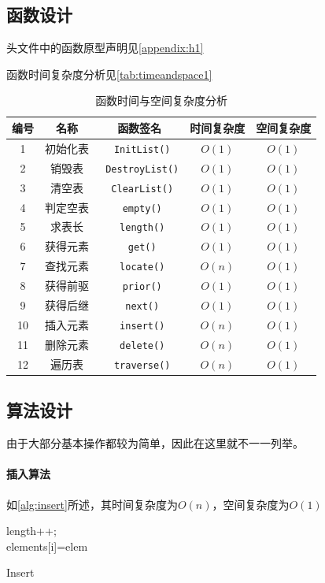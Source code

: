 \subsection{函数设计}
头文件中的函数原型声明见\autoref{appendix:h1}
\par
函数时间复杂度分析见\autoref{tab:timeandspace1}
\begin{table}[h]
\centering
\caption{函数时间与空间复杂度分析}
\label{tab:timeandspace1}
\begin{tabular}{@{}ccccc@{}}
\toprule
编号                          & 名称  & 函数签名 & 时间复杂度 & 空间复杂度 \\ \toprule
    \multicolumn{1}{c|}{1}  & 初始化表 & \texttt{ InitList()} & $O(1)$ &  $O(1)$ \\
    \multicolumn{1}{c|}{2}  & 销毁表& \texttt{ DestroyList()} & $O(1)$ &  $O(1)$ \\
    \multicolumn{1}{c|}{3}  & 清空表& \texttt{ ClearList()} & $O(1)$ &  $O(1)$   \\
    \multicolumn{1}{c|}{4}  & 判定空表& \texttt{ empty()} & $O(1)$ &  $O(1)$     \\
    \multicolumn{1}{c|}{5}  & 求表长 & \texttt{ length()} & $O(1)$ &  $O(1)$     \\
    \multicolumn{1}{c|}{6}  & 获得元素 & \texttt{ get()} & $O(1)$ &  $O(1)$      \\
    \multicolumn{1}{c|}{7}  & 查找元素 & \texttt{ locate()} & $O(n)$ &  $O(1)$   \\
    \multicolumn{1}{c|}{8}  & 获得前驱 & \texttt{ prior()} & $O(1)$ &  $O(1)$    \\
    \multicolumn{1}{c|}{9}  & 获得后继 & \texttt{ next()} & $O(1)$ &  $O(1)$     \\
    \multicolumn{1}{c|}{10}  & 插入元素 & \texttt{ insert()} & $O(n)$ &  $O(1)$  \\
    \multicolumn{1}{c|}{11}  & 删除元素 & \texttt{ delete()} & $O(n)$ &  $O(1)$  \\
    \multicolumn{1}{c|}{12}  & 遍历表 & \texttt{ traverse()}   & $O(n)$ & $O(1)$ \\ \bottomrule
\end{tabular}
\end{table}
\subsection{算法设计}
由于大部分基本操作都较为简单，因此在这里就不一一列举。
\paragraph{插入算法}如\autoref{alg:insert}所述，其时间复杂度为$O(n)$，空间复杂度为$O(1)$
\par
\begin{algorithm}[H]
    \SetAlgoLined
    length++;
    \\
    elements[i]=elem
\caption{Insert}\label{alg:insert}
\end{algorithm}
